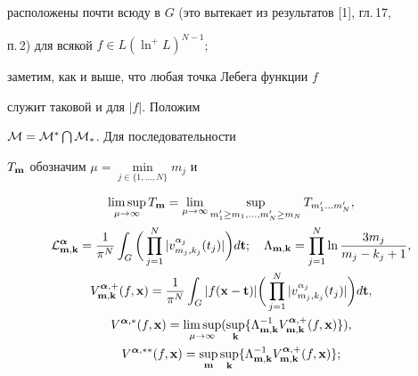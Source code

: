 расположены почти всюду в $G$ (это вытекает из результатов [1], гл.\,17,


п.\,2) для всякой $f\in L(\ln^+L)^{N-1}$;


заметим, как и выше, что любая точка Лебега функции $f$


служит таковой и для $|f|$. Положим


${\cal M}={\cal M}^* \bigcap {\cal M}_*$. Для последовательности


$T_{\bold m}$ обозначим $\mu=\min\limits_{j\in \{1,\dotsc,N\}} m_j$ и


\begin{gather}


\limsup_{\mu\to\infty}T_{\bold m}=\lim_{\mu\to\infty}


\sup_{m'_1\ge m_1,\dotsc,m'_N\ge m_N}T_{m'_1\dotsc m'_N},\notag \\


%


{\cal L}_{{\bold m},{\bold k}}^{{\boldsymbol{\alpha}}}=\frac {1}{\pi^N}\int_{G}


\bigg(\prod_{j=1}^N |v_{m_j,k_j}^{\alpha_j}(t_j)|\bigg)d{\bold t}; \quad


\Lambda_{{\bold m},{\bold k}}


=\prod_{j=1}^N\ln \frac {3m_j}{m_j-k_j+1}, \notag \\


%


V_{{\bold m},{\bold k}}^{{\boldsymbol{\alpha}},+}(f,{\bold x})=


\frac{1}{\pi^N}\int_{G}| f ({\bold x}-{\bold t})|


\bigg(\prod_{j=1}^N|v_{m_j,k_j}^{\alpha_j}(t_j)|\bigg)d{\bold t}, \\


%


V^{{\boldsymbol{\alpha}},*}(f,{\bold x})=\limsup_{\mu\to\infty}


(\sup_{\bold k} \{\Lambda^{-1}_{{\bold m},{\bold k}}


V_{{\bold m},{\bold k}}^{{\boldsymbol{\alpha}},+}(f,{\bold x})\}),\notag\\


%


V^{{\boldsymbol{\alpha}},**}(f,{\bold x})=\sup_{\bold m}


\sup_{\bold k} \{\Lambda^{-1}_{{\bold m},{\bold k}}


V_{{\bold m},{\bold k}}^{{\boldsymbol{\alpha}},+}(f,{\bold x})\};\notag


\end{gather}


